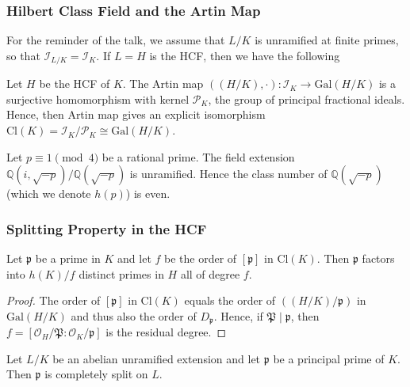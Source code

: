 \documentclass{beamer}
\newcommand{\Gal}{\mathrm{Gal}}
\newcommand{\Cl}{\mathrm{Cl}}
\newcommand{\PP}{\mathfrak{P}}
\newcommand{\QQ}{\mathbb{Q}}
\newcommand{\pp}{\mathfrak{p}}
\theoremstyle{plain}
\begin{document}
\begin{frame}
    \frametitle{Hilbert Class Field and the Artin Map}
    For the reminder of the talk, we assume that $L/K$ is unramified at finite primes, so that $\mathcal{I}_{L/K}=\mathcal{I}_K$. 
    \pause
    If $L=H$ is the HCF, then we have the following \pause
    \begin{theorem}
        Let $H$ be the HCF of $K$. The Artin map $((H/K),\cdot):\mathcal{I}_K\to\Gal(H/K)$ is a surjective homomorphism with kernel $\mathcal{P}_K$, the group of principal fractional ideals.
        \pause
        Hence, then Artin map gives an explicit isomorphism $\Cl(K)=\mathcal{I}_K/\mathcal{P}_K\cong\Gal(H/K)$.
    \end{theorem}
    \pause
    \begin{example}
        Let $p\equiv1\pmod{4}$ be a rational prime. The field extension $\QQ(i,\sqrt{-p})/\QQ(\sqrt{-p})$ is unramified. \pause Hence the class number of $\QQ(\sqrt{-p})$ (which we denote $h(p)$) is even.    
    \end{example}
\end{frame}




\begin{frame}
    \frametitle{Splitting Property in the HCF}
    \begin{corollary}
        Let $\pp$ be a prime in $K$ and let $f$ be the order of $[\pp]$ in $\Cl(K)$. Then $\pp$ factors into $h(K)/f$ distinct primes in $H$ all of degree $f$.         
    \end{corollary}
    \pause
    \begin{proof}
        The order of $[\pp]$ in $\Cl(K)$ equals the order of $((H/K)/\pp)$ in $\Gal(H/K)$ and thus also the order of $D_\pp$. \pause Hence, if $\PP\mid\pp$, then $f=[\mathcal{O}_H/\PP:\mathcal{O}_K/\pp]$ is the residual degree.
    \end{proof}
    \pause
    \begin{corollary}
        Let $L/K$ be an abelian unramified extension and let $\pp$ be a principal prime of $K$. Then $\pp$ is completely split on $L$.
    \end{corollary}
    
\end{frame}
\end{document}
